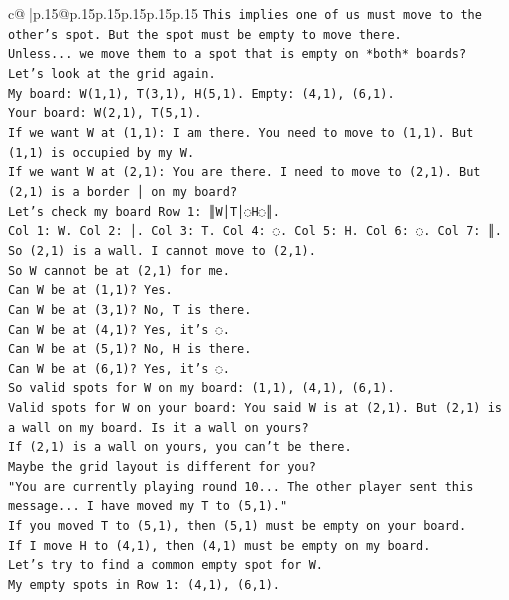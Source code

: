 \documentclass{article}
\begin{document}
{\begin{supertabular}{c@{$\;$}|p{.15\linewidth}@{}p{.15\linewidth}p{.15\linewidth}p{.15\linewidth}p{.15\linewidth}p{.15\linewidth}}
{{{\texttt{This implies one of us must move to the other's spot. But the spot must be empty to move there.} \\
\texttt{Unless... we move them to a spot that is empty on *both* boards?} \\
\texttt{Let's look at the grid again.} \\
\texttt{My board: W(1,1), T(3,1), H(5,1). Empty: (4,1), (6,1).} \\
\texttt{Your board: W(2,1), T(5,1).} \\
\texttt{If we want W at (1,1): I am there. You need to move to (1,1). But (1,1) is occupied by my W.} \\
\texttt{If we want W at (2,1): You are there. I need to move to (2,1). But (2,1) is a border │ on my board?} \\
\texttt{Let's check my board Row 1: ║W│T│◌H◌║.} \\
\texttt{Col 1: W. Col 2: │. Col 3: T. Col 4: ◌. Col 5: H. Col 6: ◌. Col 7: ║.} \\
\texttt{So (2,1) is a wall. I cannot move to (2,1).} \\
\texttt{So W cannot be at (2,1) for me.} \\
\texttt{Can W be at (1,1)? Yes.} \\
\texttt{Can W be at (3,1)? No, T is there.} \\
\texttt{Can W be at (4,1)? Yes, it's ◌.} \\
\texttt{Can W be at (5,1)? No, H is there.} \\
\texttt{Can W be at (6,1)? Yes, it's ◌.} \\
\texttt{So valid spots for W on my board: (1,1), (4,1), (6,1).} \\
\texttt{Valid spots for W on your board: You said W is at (2,1). But (2,1) is a wall on my board. Is it a wall on yours?} \\
\texttt{If (2,1) is a wall on yours, you can't be there.} \\
\texttt{Maybe the grid layout is different for you?} \\
\texttt{"You are currently playing round 10... The other player sent this message... I have moved my T to (5,1)."} \\
\texttt{If you moved T to (5,1), then (5,1) must be empty on your board.} \\
\texttt{If I move H to (4,1), then (4,1) must be empty on my board.} \\
\texttt{Let's try to find a common empty spot for W.} \\
\texttt{My empty spots in Row 1: (4,1), (6,1).} \\
}}}
\end{supertabular}}
\end{document}
